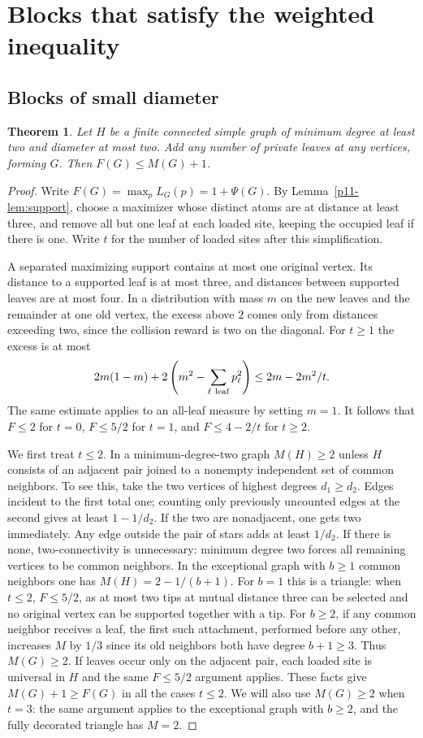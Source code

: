 \documentclass[11pt,a4paper]{article}
\newtheorem{theorem}{Theorem}[section]
\begin{document}
\section{Blocks that satisfy the weighted inequality}
\subsection{Blocks of small diameter}

\begin{theorem}\label{p11-th:diameter-two}
Let $H$ be a finite connected simple graph of minimum degree at least two and diameter at most two. Add any number of private leaves at any vertices, forming $G$. Then $F(G)\le M(G)+1$.
\end{theorem}
\begin{proof}
Write $F(G)=\max_p L_G(p)=1+\Psi(G)$. By Lemma~\ref{p11-lem:support}, choose a maximizer whose distinct atoms are at distance at least three, and remove all but one leaf at each loaded site, keeping the occupied leaf if there is one. Write $t$ for the number of loaded sites after this simplification.

A separated maximizing support contains at most one original vertex.
Its distance to a supported leaf is at most three, and distances
between supported leaves are at most four. In a distribution with mass $m$
on the new leaves and the remainder at one old vertex, the excess above
$2$ comes only from distances exceeding two, since the collision reward
is two on the diagonal. For $t\ge1$ the excess is at most
\[
 2m(1-m)+2\left(m^2-\sum_{\ell\ {\rm leaf}}p_\ell^2\right)
 \le 2m-2m^2/t .
\]
The same estimate applies to an all-leaf measure by setting $m=1$.
It follows that $F\le 2$ for $t=0$, $F\le5/2$ for $t=1$, and
$F\le4-2/t$ for $t\ge2$.

We first treat $t\le2$. In a minimum-degree-two graph $M(H)\ge2$
unless $H$ consists of an adjacent pair joined to a nonempty independent
set of common neighbors. To see this, take the two vertices of highest
degrees $d_1\ge d_2$. Edges incident to the first total one; counting
only previously uncounted edges at the second gives at least $1-1/d_2$.
If the two are nonadjacent, one gets two immediately. Any edge outside
the pair of stars adds at least $1/d_2$. If there is none, two-connectivity
is unnecessary: minimum degree two forces all remaining vertices to be
common neighbors. In the exceptional graph with $b\ge1$ common neighbors
one has $M(H)=2-1/(b+1)$. For $b=1$ this is a triangle: when $t\le2$,
$F\le5/2$, as at most two tips at mutual distance three can be selected
and no original vertex can be supported together with a tip.
For $b\ge2$, if any common neighbor receives a leaf, the first such
attachment, performed before any other, increases $M$ by $1/3$ since
its old neighbors both have degree $b+1\ge3$. Thus $M(G)\ge2$.
If leaves occur only on the adjacent pair, each loaded site is universal
in $H$ and the same $F\le5/2$ argument applies. These facts give
$M(G)+1\ge F(G)$ in all the cases $t\le2$. We will also use
$M(G)\ge2$ when $t=3$: the same argument applies to the exceptional
graph with $b\ge2$, and the fully decorated triangle has $M=2$.


\end{proof}
\end{document}
